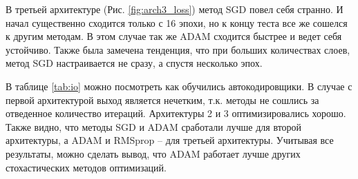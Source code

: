 \documentclass[12pt, a4paper]{article}
\begin{document}
            В третьей архитектуре (Рис. \ref{fig:arch3_loss}) метод SGD повел себя странно. И начал существенно сходится только с 16 эпохи, но к концу теста все же сошелся к другим методам. В этом случае так же ADAM сходится быстрее и ведет себя устойчиво. Также была замечена тенденция, что при больших количествах слоев, метод SGD настраивается не сразу, а спустя несколько эпох.

            В таблице \ref{tab:io} можно посмотреть как обучились автокодировщики. В случае с первой архитектурой выход является нечетким, т.к. методы не сошлись за отведенное количество итераций. Архитектуры 2 и 3 оптимизировались хорошо. Также видно, что методы SGD и ADAM сработали лучше для второй архитектуры, а ADAM и RMSprop -- для третьей архитектуры. Учитывая все результаты, можно сделать вывод, что ADAM работает лучше других стохастических методов оптимизаций.
\end{document}

